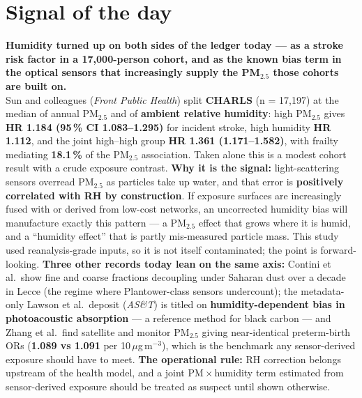 \documentclass[10pt]{article}
\begin{document}
\vspace{6mm}

\section*{\sffamily\bfseries\color{Deep}Signal of the day}
\vspace{-1.5mm}{\color{Amber}\rule{\linewidth}{1.1pt}}\vspace{2.5mm}

\begin{keybox}
{\sffamily\bfseries\small\color{Deep}Humidity turned up on both sides of the ledger today ---
as a stroke risk factor in a 17,000-person cohort, and as the known bias term in the optical
sensors that increasingly supply the PM$_{2.5}$ those cohorts are built on.}\\[1.4mm]
\footnotesize
Sun and colleagues (\textit{Front Public Health}) split \textbf{CHARLS} (n = 17,197) at the
median of annual PM$_{2.5}$ and of \textbf{ambient relative humidity}: high PM$_{2.5}$ gives
\textbf{HR 1.184 (95\,\% CI 1.083--1.295)} for incident stroke, high humidity
\textbf{HR 1.112}, and the joint high--high group \textbf{HR 1.361 (1.171--1.582)}, with frailty
mediating \textbf{18.1\,\%} of the PM$_{2.5}$ association. Taken alone this is a modest cohort
result with a crude exposure contrast. \textbf{Why it is the signal:} light-scattering sensors
overread PM$_{2.5}$ as particles take up water, and that error is \textbf{positively correlated
with RH by construction}. If exposure surfaces are increasingly fused with or derived from
low-cost networks, an uncorrected humidity bias will manufacture exactly this pattern --- a
PM$_{2.5}$ effect that grows where it is humid, and a ``humidity effect'' that is partly
mis-measured particle mass. This study used reanalysis-grade inputs, so it is not itself
contaminated; the point is forward-looking. \textbf{Three other records today lean on the same
axis:} Contini et al.\ show fine and coarse fractions decoupling under Saharan dust over a
decade in Lecce (the regime where Plantower-class sensors undercount); the metadata-only
Lawson et al.\ deposit (\textit{AS\&T}) is titled on \textbf{humidity-dependent bias in photoacoustic
absorption} --- a reference method for black carbon --- and Zhang et al.\ find satellite and
monitor PM$_{2.5}$ giving near-identical preterm-birth ORs (\textbf{1.089 vs 1.091} per
10\,$\mu$g\,m$^{-3}$), which is the benchmark any sensor-derived exposure should have to meet.
\textbf{The operational rule:} RH correction belongs upstream of the health model, and a joint
PM\,$\times$\,humidity term estimated from sensor-derived exposure should be treated as
suspect until shown otherwise.\par
\end{keybox}
\end{document}
